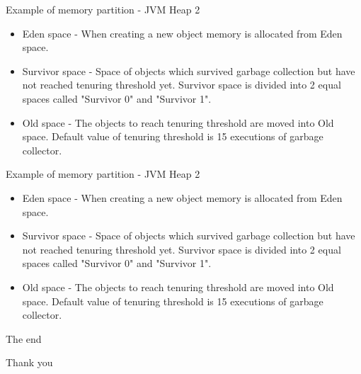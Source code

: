 \documentclass[presentation]{beamer}
\begin{document}
\begin{frame}{Example of memory partition - JVM Heap 2}
	\begin{itemize}
		\item Eden space - When creating a new object memory is allocated from Eden space.
		\item Survivor space - Space of objects which survived garbage collection but have not reached tenuring threshold yet. Survivor space is divided into 2 equal spaces called "Survivor 0" and "Survivor 1".
		\item Old space - The objects to reach tenuring threshold are moved into Old space. Default value of tenuring threshold is 15 executions of garbage collector.
	\end{itemize}
\end{frame}

\begin{frame}{Example of memory partition - JVM Heap 2}
\begin{itemize}
	\item Eden space - When creating a new object memory is allocated from Eden space.
	\item Survivor space - Space of objects which survived garbage collection but have not reached tenuring threshold yet. Survivor space is divided into 2 equal spaces called "Survivor 0" and "Survivor 1".
	\item Old space - The objects to reach tenuring threshold are moved into Old space. Default value of tenuring threshold is 15 executions of garbage collector.
\end{itemize}
\end{frame}

\begin{frame}{The end}
\begin{center}
Thank you
\end{center}
\end{frame}
\end{document}
